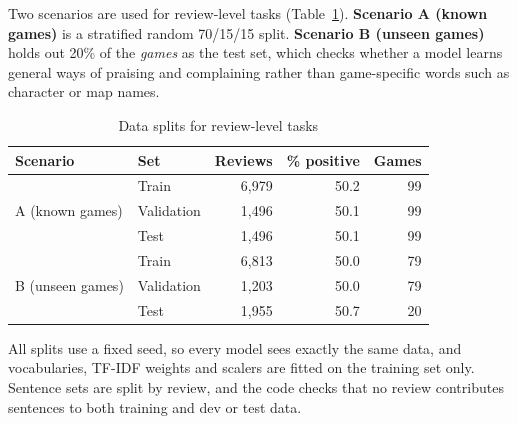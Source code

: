 Two scenarios are used for review-level tasks (Table~\ref{tab:splits}). \textbf{Scenario A (known games)} is a stratified random 70/15/15 split. \textbf{Scenario B (unseen games)} holds out 20\% of the \textit{games} as the test set, which checks whether a model learns general ways of praising and complaining rather than game-specific words such as character or map names.

\begin{table}[!htbp]
\centering
\caption{Data splits for review-level tasks}
\label{tab:splits}
\begin{tabular}{llrrr}
\toprule
\textbf{Scenario} & \textbf{Set} & \textbf{Reviews} & \textbf{\% positive} & \textbf{Games} \\
\midrule
\multirow{3}{*}{A (known games)} & Train & 6,979 & 50.2 & 99 \\
 & Validation & 1,496 & 50.1 & 99 \\
 & Test & 1,496 & 50.1 & 99 \\
\midrule
\multirow{3}{*}{B (unseen games)} & Train & 6,813 & 50.0 & 79 \\
 & Validation & 1,203 & 50.0 & 79 \\
 & Test & 1,955 & 50.7 & 20 \\
\bottomrule
\end{tabular}
\end{table}

All splits use a fixed seed, so every model sees exactly the same data, and vocabularies, TF-IDF weights and scalers are fitted on the training set only. Sentence sets are split by review, and the code checks that no review contributes sentences to both training and dev or test data.
